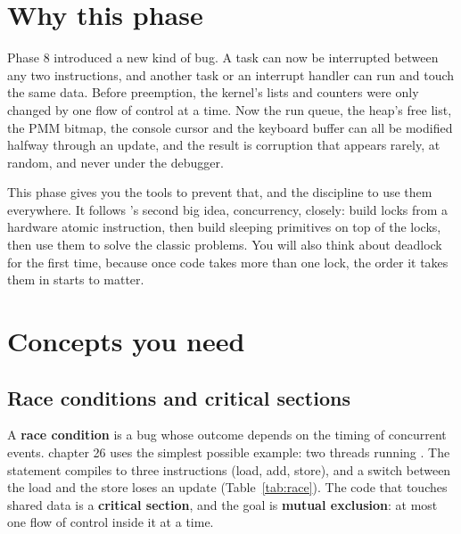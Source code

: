 \documentclass[11pt,a4paper]{article}
\begin{document}


\section{Why this phase}

Phase 8 introduced a new kind of bug. A task can now be interrupted between any two instructions, and another task
or an interrupt handler can run and touch the same data. Before preemption, the kernel's lists and counters were
only changed by one flow of control at a time. Now the run queue, the heap's free list, the PMM bitmap, the console
cursor and the keyboard buffer can all be modified halfway through an update, and the result is corruption that
appears rarely, at random, and never under the debugger.

This phase gives you the tools to prevent that, and the discipline to use them everywhere. It follows \OSTEP's
second big idea, concurrency, closely: build locks from a hardware atomic instruction, then build sleeping primitives
on top of the locks, then use them to solve the classic problems. You will also think about deadlock for the first
time, because once code takes more than one lock, the order it takes them in starts to matter.

\section{Concepts you need}

\subsection{Race conditions and critical sections}

A \textbf{race condition} is a bug whose outcome depends on the timing of concurrent events. \OSTEP chapter 26 uses
the simplest possible example: two threads running . The statement compiles to three
instructions (load, add, store), and a switch between the load and the store loses an update (Table~\ref{tab:race}).
The code that touches shared data is a \textbf{critical section}, and the goal is \textbf{mutual exclusion}: at most
one flow of control inside it at a time.
\end{document}
